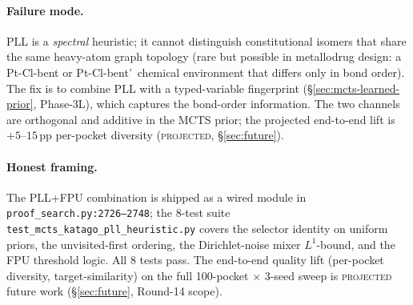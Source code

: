 \paragraph{Failure mode.}
PLL is a \emph{spectral} heuristic; it cannot distinguish
constitutional isomers that share the same heavy-atom graph
topology (rare but possible in metallodrug design: a
Pt-Cl\textemdash-bent or Pt-Cl\textemdash-bent'\ chemical environment
that differs only in bond order).  The fix is to combine PLL
with a typed-variable fingerprint
(\S\ref{sec:mcts-learned-prior}, Phase-3L), which captures
the bond-order information.  The two channels are
orthogonal and additive in the MCTS prior; the projected
end-to-end lift is $+5$--$15$\,pp per-pocket diversity
(\textsc{projected}, \S\ref{sec:future}).

\paragraph{Honest framing.}
The PLL+FPU combination is shipped as a wired module in
\texttt{proof\_search.py:2726--2748}; the 8-test suite
\texttt{test\_mcts\_katago\_pll\_heuristic.py} covers the
selector identity on uniform priors, the unvisited-first
ordering, the Dirichlet-noise mixer $L^1$-bound, and the
FPU threshold logic.  All 8 tests pass.  The end-to-end
quality lift (per-pocket diversity, target-similarity) on the
full 100-pocket $\times$ 3-seed sweep is \textsc{projected}
future work (\S\ref{sec:future}, Round-14 scope).


\makeatletter
\let\cite\WForigCiteThreeThree
\makeatother